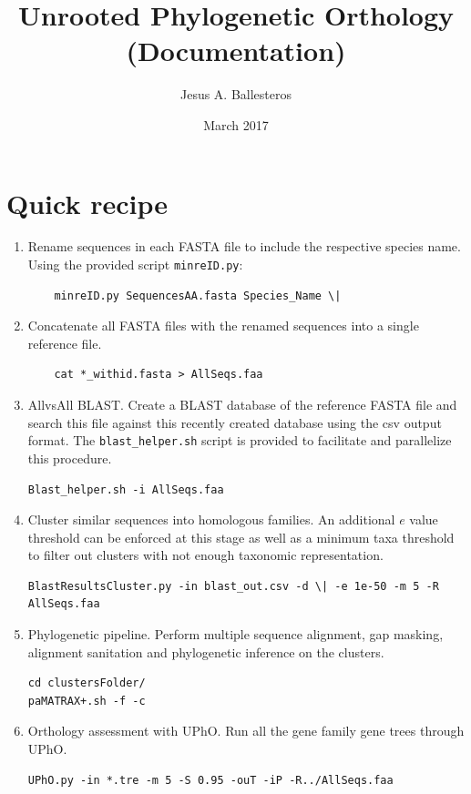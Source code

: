 \documentclass[10pt]{article}
\title{
  {\Huge\color{red}U}nrooted 
  {\Huge\color{red}Ph}ylogenetic 
  {\Huge\color{red}O}rthology
\\(Documentation)
}
\author{Jesus A. Ballesteros}
\date{March 2017}
\begin{document}
\maketitle
\section{Quick recipe}
\begin{enumerate}
\item Rename sequences in  each FASTA file to include the respective species name. Using
  the provided script \texttt{minreID.py}:
  \begin{lstlisting}
    minreID.py SequencesAA.fasta Species_Name \| \end{lstlisting}
\item Concatenate all FASTA files with the renamed sequences into a single reference
  file.
  \begin{lstlisting}
    cat *_withid.fasta > AllSeqs.faa \end{lstlisting}
\item AllvsAll BLAST. Create a BLAST database of the reference FASTA
file and search this file against this recently created database using
the csv output format. The \texttt{blast\_helper.sh} script is
provided to facilitate and parallelize this procedure.
  \begin{lstlisting} 
Blast_helper.sh -i AllSeqs.faa  \end{lstlisting}
\item Cluster similar sequences into homologous families. An
additional $e$ value threshold can be enforced at this stage as well
as a minimum taxa threshold to filter out clusters with not enough
taxonomic representation.
  \begin{lstlisting} 
BlastResultsCluster.py -in blast_out.csv -d \| -e 1e-50 -m 5 -R AllSeqs.faa \end{lstlisting}
\item Phylogenetic pipeline. Perform multiple sequence alignment, gap
masking, alignment sanitation and phylogenetic inference on the
clusters.
  \begin{lstlisting} 
cd clustersFolder/ 
paMATRAX+.sh -f -c \end{lstlisting}
\item Orthology assessment with UPhO. Run all the gene family gene
trees through UPhO.
  \begin{lstlisting} 
UPhO.py -in *.tre -m 5 -S 0.95 -ouT -iP -R../AllSeqs.faa \end{lstlisting}
\end{enumerate}
\end{document}
